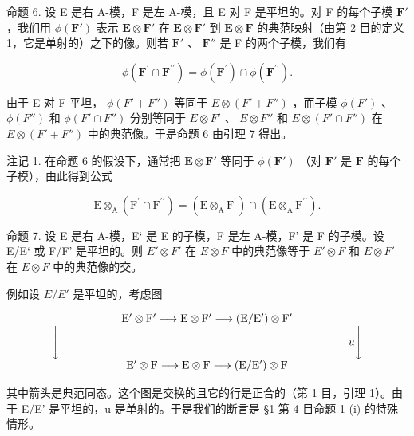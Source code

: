 命题 6. 设 E 是右 A-模，F 是左 A-模，且 E 对 F 是平坦的。对 F 的每个子模 \(\mathbf{F}'\) ，我们用 \(\phi(\mathbf{F}')\) 表示 \(\mathbf{E} \otimes \mathbf{F}'\) 在 \(\mathbf{E} \otimes \mathbf{F}'\) 到 \(\mathbf{E} \otimes \mathbf{F}\) 的典范映射（由第 2 目的定义 1，它是单射的）之下的像。则若 \(\mathbf{F}'\) 、 \(\mathbf{F}''\) 是 F 的两个子模，我们有

\[
\phi (\mathbf {F} ^ {\prime} \cap \mathbf {F} ^ {\prime \prime}) = \phi (\mathbf {F} ^ {\prime}) \cap \phi (\mathbf {F} ^ {\prime \prime}).
\]

由于 E 对 F 平坦， \(\phi(F' + F'')\) 等同于 \(E \otimes (F' + F'')\) ，而子模 \(\phi(F')\) 、 \(\phi(F'')\) 和 \(\phi(F' \cap F'')\) 分别等同于 \(E \otimes F'\) 、 \(E \otimes F''\) 和 \(E \otimes (F' \cap F'')\) 在 \(E \otimes (F' + F'')\) 中的典范像。于是命题 6 由引理 7 得出。

注记 1. 在命题 6 的假设下，通常把 \(\mathbf{E} \otimes \mathbf{F}'\) 等同于 \(\phi(\mathbf{F}')\) （对 \(\mathbf{F}'\) 是 \(\mathbf{F}\) 的每个子模），由此得到公式

\[
\mathrm{E} \otimes_ {\mathrm{A}} (\mathrm{F} ^ {\prime} \cap \mathrm{F} ^ {\prime \prime}) = (\mathrm{E} \otimes_ {\mathrm{A}} \mathrm{F} ^ {\prime}) \cap (\mathrm{E} \otimes_ {\mathrm{A}} \mathrm{F} ^ {\prime \prime}).
\]

命题 7. 设 E 是右 A-模，E‘ 是 E 的子模，F 是左 A-模，F’ 是 F 的子模。设 E/E‘ 或 F/F’ 是平坦的。则 \(E' \otimes F'\) 在 \(E \otimes F\) 中的典范像等于 \(E' \otimes F\) 和 \(E \otimes F'\) 在 \(E \otimes F\) 中的典范像的交。

例如设 \(E/E'\) 是平坦的，考虑图

\[
\begin{array}{c} \mathrm{E} ^ {\prime} \otimes \mathrm{F} ^ {\prime} \longrightarrow \mathrm{E} \otimes \mathrm{F} ^ {\prime} \longrightarrow (\mathrm{E} / \mathrm{E} ^ {\prime}) \otimes \mathrm{F} ^ {\prime} \\ \Biggl \downarrow \qquad \qquad \qquad \qquad \qquad \qquad \qquad \qquad \qquad \qquad \qquad \qquad \qquad u \Biggl \downarrow \\ \mathrm{E} ^ {\prime} \otimes \mathrm{F} \longrightarrow \mathrm{E} \otimes \mathrm{F} \longrightarrow (\mathrm{E} / \mathrm{E} ^ {\prime}) \otimes \mathrm{F} \end{array}
\]

其中箭头是典范同态。这个图是交换的且它的行是正合的（第 1 目，引理 1）。由于 E/E' 是平坦的，u 是单射的。于是我们的断言是 §1 第 4 目命题 1 (i) 的特殊情形。

